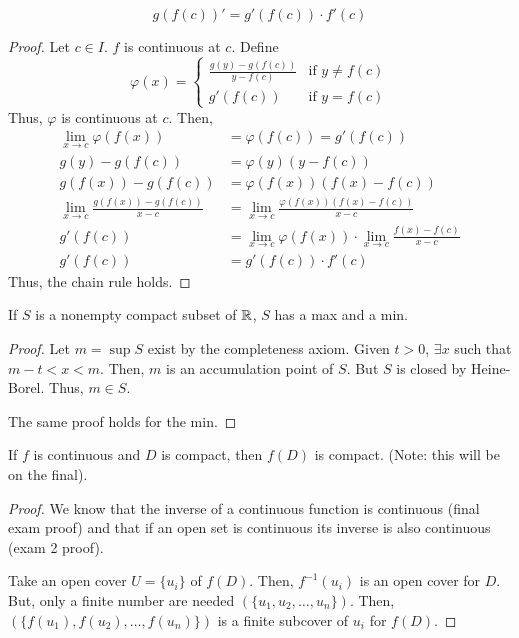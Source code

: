 \begin{theorem}
    $$g(f(c))' = g'(f(c)) \cdot f'(c)$$
\end{theorem}
\begin{proof}
    Let $c \in I$. $f$ is continuous at $c$. Define
    $$\varphi(x) = 
    \begin{cases}
        \frac{g(y) - g(f(c))}{y - f(c)} & \text{if } y \neq f(c) \\
        g'(f(c)) & \text{if } y = f(c)
    \end{cases}$$
    Thus, $\varphi$ is continuous at $c$. Then,
    \begin{align*}
        \lim_{x \to c} \varphi(f(x)) &= \varphi(f(c)) = g'(f(c)) \\
        g(y) - g(f(c)) &= \varphi(y)(y - f(c)) \\
        g(f(x)) - g(f(c)) &= \varphi(f(x))(f(x) - f(c)) \\
        \lim_{x \to c} \frac{g(f(x)) - g(f(c))}{x - c} &= \lim_{x \to c} \frac{\varphi(f(x))(f(x) - f(c))}{x - c} \\
        g'(f(c)) &= \lim_{x \to c} \varphi(f(x)) \cdot \lim_{x \to c} \frac{f(x) - f(c)}{x - c} \\
        g'(f(c)) &= g'(f(c)) \cdot f'(c)
    \end{align*}
    Thus, the chain rule holds.
\end{proof}
\pagebreak

\begin{theorem}
    If $S$ is a nonempty compact subset of $\mathbb{R}$, $S$ has a max and a min.
\end{theorem}
\begin{proof}
    Let $m = \sup S$ exist by the completeness axiom. Given $t > 0$, $\exists x$ such that $m - t < x < m$. Then, $m$ is an accumulation point of $S$. But $S$ is closed by Heine-Borel. Thus, $m \in S$.

    The same proof holds for the min.
\end{proof}

\begin{theorem}
    If $f$ is continuous and $D$ is compact, then $f(D)$ is compact. (Note: this will be on the final).
\end{theorem}
\begin{proof}
    We know that the inverse of a continuous function is continuous (final exam proof) and that if an open set is continuous its inverse is also continuous (exam 2 proof).
    
    Take an open cover $U = \{u_i\}$ of $f(D)$. Then, $f^{-1}(u_i)$ is an open cover for $D$. But, only a finite number are needed $(\{u_1, u_2, \ldots, u_n\})$. Then, $(\{f(u_1), f(u_2), \ldots, f(u_n)\})$ is a finite subcover of $u_i$ for $f(D)$.
\end{proof}

